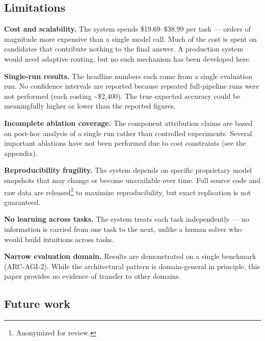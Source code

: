 \documentclass[10pt]{article}
\begin{document}
\hypertarget{limitations}{%
\subsection{Limitations}\label{limitations}}

\textbf{Cost and scalability.} The system spends \$19.69--\$38.99 per
task --- orders of magnitude more expensive than a single model call.
Much of the cost is spent on candidates that contribute nothing to the
final answer. A production system would need adaptive routing, but no
such mechanism has been developed here.

\textbf{Single-run results.} The headline numbers each come from a
single evaluation run. No confidence intervals are reported because
repeated full-pipeline runs were not performed (each costing
\textasciitilde\$2,400). The true expected accuracy could be
meaningfully higher or lower than the reported figures.

\textbf{Incomplete ablation coverage.} The component attribution claims
are based on post-hoc analysis of a single run rather than controlled
experiments. Several important ablations have not been performed due to
cost constraints (see the appendix).

\textbf{Reproducibility fragility.} The system depends on specific
proprietary model snapshots that may change or become unavailable over
time. Full source code and raw data are released\footnote{Anonymized for
  review.} to maximize reproducibility, but exact replication is not
guaranteed.

\textbf{No learning across tasks.} The system treats each task
independently --- no information is carried from one task to the next,
unlike a human solver who would build intuitions across tasks.

\textbf{Narrow evaluation domain.} Results are demonstrated on a single
benchmark (ARC-AGI-2). While the architectural pattern is domain-general
in principle, this paper provides no evidence of transfer to other
domains.

\hypertarget{future-work}{%
\subsection{Future work}\label{future-work}}
\end{document}
